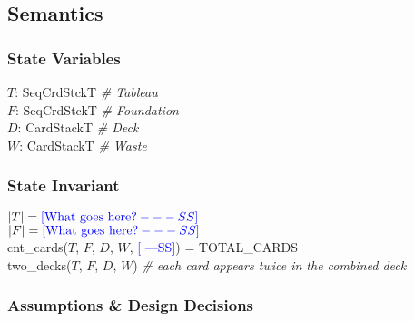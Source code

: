 \documentclass[12pt]{article}
\newcommand{\authornote}[3]{\textcolor{#1}{[#3 ---#2]}}
\newcommand{\authornote}[3]{}
\newcommand{\wss}[1]{\authornote{blue}{SS}{#1}}
\begin{document}
\subsection* {Semantics}

\subsubsection* {State Variables}

$T$: SeqCrdStckT \textit{\# Tableau}\\
$F$: SeqCrdStckT \textit{\# Foundation}\\
$D$: CardStackT \textit{\# Deck}\\
$W$: CardStackT \textit{\# Waste}\\

\subsubsection* {State Invariant}

$|T| = \wss{\text{What goes here?}}$\\
$|F| = \wss{\text{What goes here?}}$\\
cnt\_cards($T$, $F$, $D$, $W$, \wss{}) = TOTAL\_CARDS\\
two\_decks($T$, $F$, $D$, $W$) \textit{\# each card appears twice in the combined deck}

\subsubsection* {Assumptions \& Design Decisions}
\end{document}
